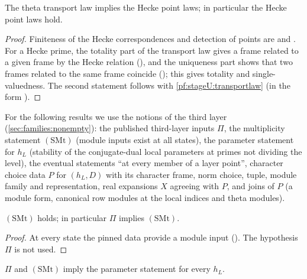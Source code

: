\begin{lemma}\label{pf:stageU:pointlaws}
The theta transport law implies the Hecke point laws; in particular the Hecke point laws hold.
\end{lemma}

\begin{proof}
Finiteness of the Hecke correspondences and detection of points are  and
. For a Hecke prime, the totality part of the transport law gives a frame
related to a given frame by the Hecke relation (), and the uniqueness part shows
that two frames related to the same frame coincide (); this gives totality and
single-valuedness. The second statement follows with \cref{pf:stageU:transportlaw} (in the form
).
\end{proof}

For the following results we use the notions of the third layer (\cref{sec:families:nonempty}): the published third-layer inputs
$\Pi$, the multiplicity statement $\mathrm{(SMt)}$ (module inputs exist at all states), the parameter statement for $h_L$
(stability of the conjugate-dual local parameters at primes not dividing the level), the eventual statements ``at every member of
a layer point'', character choice data $P$ for $(h_L,D)$ with its character frame, norm choice, tuple, module family and
representation, real expansions $X$ agreeing with $P$, and joins of $P$ (a module form, canonical row modules at the local indices
and theta modules).

\begin{lemma}\label{pf:stageU:smt}
$\mathrm{(SMt)}$ holds; in particular $\Pi$ implies $\mathrm{(SMt)}$.
\end{lemma}

\begin{proof}
At every state the pinned data provide a module input (). The hypothesis $\Pi$ is not used.
\end{proof}

\begin{lemma}\label{pf:stageU:conjdual}
$\Pi$ and $\mathrm{(SMt)}$ imply the parameter statement for every $h_L$.
\end{lemma}

